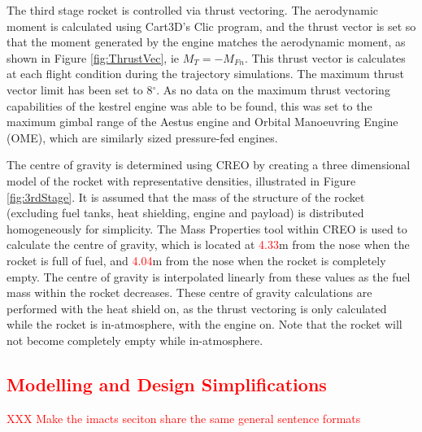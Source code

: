 		The third stage rocket is controlled via thrust vectoring. The aerodynamic moment is calculated using Cart3D's Clic program, and the thrust vector is set so that the moment generated by the engine matches the aerodynamic moment, as shown in Figure \ref{fig:ThrustVec}, ie $M_{T} = -M_{Fn}$. This thrust vector is calculates at each flight condition during the trajectory simulations. The maximum thrust vector limit has been set to 8$^\circ$. As no data on the maximum thrust vectoring capabilities of the kestrel engine was able to be found, this was set to the maximum gimbal range of the Aestus engine and Orbital Manoeuvring Engine (OME), which are similarly sized pressure-fed engines\cite{Wade2017}.
		
		The centre of gravity is determined using CREO by creating a three dimensional model of the rocket with representative densities, illustrated in Figure \ref{fig:3rdStage}. It is assumed that the mass of the structure of the rocket (excluding fuel tanks, heat shielding, engine and payload) is distributed homogeneously for simplicity. The Mass Properties tool within CREO is used to calculate the centre of gravity, which is located at \textcolor{red}{4.33}m from the nose when the rocket is full of fuel, and \textcolor{red}{4.04}m from the nose when the rocket is completely empty. The centre of gravity is interpolated linearly from these values as the fuel mass within the rocket decreases. These centre of gravity calculations are performed with the heat shield on, as the thrust vectoring is only calculated while the rocket is in-atmosphere, with the engine on. Note that the rocket will not become completely empty while in-atmosphere. 
		
	
		

\textcolor{red}{
\section{Modelling and Design Simplifications}  %
}

\textcolor{red}{XXX Make the imacts seciton share the same general sentence formats}

